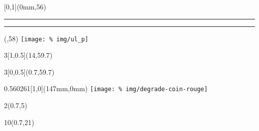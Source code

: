 \begin{frame}[plain]
  \begin{textblock*}{\paperwidth}[0,1](0mm,56\TPVertModule)
    \textcolor{rouge}{\rule{\banderougewidth}{\banderougeheight}}%
    \textcolor{or}{\rule{\bandeorwidth}{\bandeorheight}}           %
  \end{textblock*}

  \begin{textblock*}{\bandeorwidth}(\banderougewidth,58\TPVertModule)
    \texttt{[image: \%
      img/ul\_p]}
  \end{textblock*}
  \begin{textblock*}{3\TPHorizModule}[1,0.5](14\TPHorizModule,59.7\TPVertModule)
    \raggedleft\fsgiid
  \end{textblock*}
  \begin{textblock*}{3\TPHorizModule}[0,0.5](0.7\TPHorizModule,59.7\TPVertModule)
	\iidurl
\end{textblock*}

  \begin{textblock*}{0.560261\imageheight}[1,0](147mm,0mm)
    \texttt{[image: \%
	img/degrade-coin-rouge]}
  \end{textblock*}

  \begin{textblock*}{2\TPHorizModule}(0.7\TPHorizModule,5\TPVertModule)
    \textcolor[rgb]{0.37,0.37,0.37}{\webinaire}
  \end{textblock*}

  \begin{textblock*}{10\TPHorizModule}(0.7\TPHorizModule,21\TPVertModule)
    \textcolor[cmyk]{0.67, 0.66, 0, 0.71}{\titlefmt}
  \end{textblock*}\end{frame}

\endgroup

